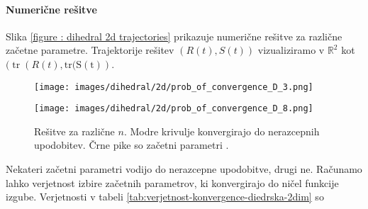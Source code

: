 \documentclass[mat2, tisk]{fmfdelo}
\newcommand{\R}{\mathbb R}
\begin{document}
      \paragraph{Numerične rešitve}
      Slika \ref{figure : dihedral 2d trajectories} prikazuje
      numerične rešitve za različne začetne parametre. Trajektorije
      rešitev $(R(t), S(t))$ vizualiziramo v $\R^2$ kot
      $(\operatorname{tr}(R(t), \operatorname{tr(S(t)})$.
          \begin{figure}[h!]
            \label{figure : dihedral 2d trajectories}
            \centering
            \begin{minipage}{0.49\textwidth}
              \centering
              \texttt{[image: images/dihedral/2d/prob\_of\_convergence\_D\_3.png]}
              \caption*{$n=3$}
            \end{minipage}
            \begin{minipage}{0.49\textwidth}
              \centering
              \texttt{[image: images/dihedral/2d/prob\_of\_convergence\_D\_8.png]}
              \caption*{$n=8$}
            \end{minipage}
            \caption[Rešitve za različne $n$. Modre krivulje
              konvergirajo do nerazcepnih upodobitev. Črne pike so
            začetni parametri]{Rešitve za različne $n$. Modre
              krivulje konvergirajo do nerazcepnih upodobitev. Črne
              pike so začetni parametri\footnotemark
            .}
            \label{fig:diedrska-2dim-trajektorije}
          \end{figure}
          Nekateri začetni parametri vodijo do nerazcepne upodobitve,
          drugi ne. Računamo lahko verjetnost izbire začetnih
          parametrov, ki konvergirajo do ničel funkcije izgube.
          Verjetnosti v tabeli
          \ref{tab:verjetnost-konvergence-diedrska-2dim} so
\end{document}
